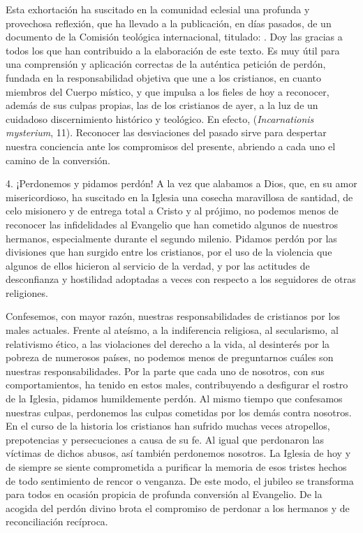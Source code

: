 \begin{body}
Esta exhortación ha suscitado en la comunidad eclesial una profunda y provechosa reflexión, que ha llevado a la publicación, en días pasados, de un documento de la Comisión teológica internacional, titulado: . Doy las gracias a todos los que han contribuido a la elaboración de este texto. Es muy útil para una comprensión y aplicación correctas de la auténtica petición de perdón, fundada en la responsabilidad objetiva que une a los cristianos, en cuanto miembros del Cuerpo místico, y que impulsa a los fieles de hoy a reconocer, además de sus culpas propias, las de los cristianos de ayer, a la luz de un cuidadoso discernimiento histórico y teológico. En efecto,  (\textit{Incarnationis mysterium}, 11). Reconocer las desviaciones del pasado sirve para despertar nuestra conciencia ante los compromisos del presente, abriendo a cada uno el camino de la conversión.

4. ¡Perdonemos y pidamos perdón! A la vez que alabamos a Dios, que, en su amor misericordioso, ha suscitado en la Iglesia una cosecha maravillosa de santidad, de celo misionero y de entrega total a Cristo y al prójimo, no podemos menos de reconocer las infidelidades al Evangelio que han cometido algunos de nuestros hermanos, especialmente durante el segundo milenio. Pidamos perdón por las divisiones que han surgido entre los cristianos, por el uso de la violencia que algunos de ellos hicieron al servicio de la verdad, y por las actitudes de desconfianza y hostilidad adoptadas a veces con respecto a los seguidores de otras religiones.

Confesemos, con mayor razón, nuestras responsabilidades de cristianos por los males actuales. Frente al ateísmo, a la indiferencia religiosa, al secularismo, al relativismo ético, a las violaciones del derecho a la vida, al desinterés por la pobreza de numerosos países, no podemos menos de preguntarnos cuáles son nuestras responsabilidades. Por la parte que cada uno de nosotros, con sus comportamientos, ha tenido en estos males, contribuyendo a desfigurar el rostro de la Iglesia, pidamos humildemente perdón. Al mismo tiempo que confesamos nuestras culpas, perdonemos las culpas cometidas por los demás contra nosotros. En el curso de la historia los cristianos han sufrido muchas veces atropellos, prepotencias y persecuciones a causa de su fe. Al igual que perdonaron las víctimas de dichos abusos, así también perdonemos nosotros. La Iglesia de hoy y de siempre se siente comprometida a purificar la memoria de esos tristes hechos de todo sentimiento de rencor o venganza. De este modo, el jubileo se transforma para todos en ocasión propicia de profunda conversión al Evangelio. De la acogida del perdón divino brota el compromiso de perdonar a los hermanos y de reconciliación recíproca.


\end{body}
